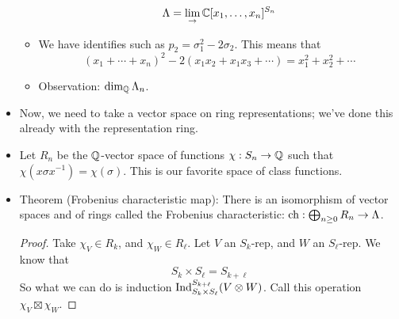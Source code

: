 \documentclass[../notes.tex]{subfiles}
\begin{document}
\begin{itemize}
\begin{itemize}
        \begin{equation*}
            \Lambda = \lim_{\rightarrow}\mathbb{C}[x_1,\dots,x_n]^{S_n}
        \end{equation*}
        \item We have identifies such as $p_2=\sigma_1^2-2\sigma_2$. This means that
        \begin{equation*}
            (x_1+\cdots+x_n)^2-2(x_1x_2+x_1x_3+\cdots) = x_1^2+x_2^2+\cdots
        \end{equation*}
        \item Observation: $\dim_{\mathbb{Q}}\Lambda_n$.
    \end{itemize}
    \item Now, we need to take a vector space on ring representations; we've done this already with the representation ring.
    \item Let $R_n$ be the $\mathbb{Q}$-vector space of functions $\chi:S_n\to\mathbb{Q}$ such that $\chi(x\sigma x^{-1})=\chi(\sigma)$. This is our favorite space of class functions.
    \item Theorem (Frobenius characteristic map): There is an isomorphism of vector spaces and of rings called the Frobenius characteristic: $\operatorname{ch}:\bigoplus_{n\geq 0}R_n\to\Lambda$.
    \begin{proof}
        Take $\chi_V\in R_k$, and $\chi_W\in R_\ell$. Let $V$ an $S_k$-rep, and $W$ an $S_\ell$-rep. We know that
        \begin{equation*}
            S_k\times S_\ell = S_{k+\ell}
        \end{equation*}
        So what we can do is induction $\operatorname{Ind}_{S_k\times S_\ell}^{S_{k+\ell}}(V\otimes W)$. Call this operation $\chi_V\boxtimes\chi_W$.


\end{proof}
\end{itemize}
\end{document}
